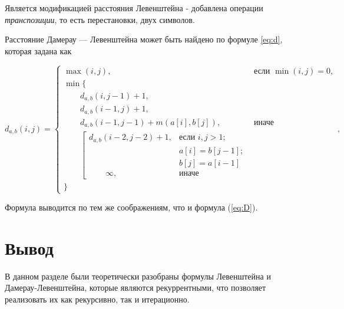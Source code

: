Является модификацией расстояния Левенштейна - добавлена операции \textit{транспозиции}, то есть перестановки, двух символов.

Расстояние Дамерау — Левенштейна может быть найдено по формуле \ref{eq:d}, которая задана как


\begin{equation}
	\label{eq:d}
	d_{a,b}(i, j) = \begin{cases}
		\max(i, j), &\text{если }\min(i, j) = 0,\\
		\min \lbrace \\
			\qquad d_{a,b}(i, j-1) + 1,\\
			\qquad d_{a,b}(i-1, j) + 1,\\
			\qquad d_{a,b}(i-1, j-1) + m(a[i], b[j]), &\text{иначе}\\
			\qquad \left[ \begin{array}{cc}d_{a,b}(i-2, j-2) + 1, &\text{если }i,j > 1;\\
			\qquad &\text{}a[i] = b[j-1]; \\
			\qquad &\text{}b[j] = a[i-1]\\
			\qquad \infty, & \text{иначе}\end{array}\right.\\
		\rbrace
		\end{cases},
\end{equation}

Формула выводится по тем же соображениям, что и формула (\ref{eq:D}).


\section*{Вывод}
В данном разделе были теоретически разобраны формулы Левенштейна и Дамерау-Левенштейна, которые являются рекуррентными, что позволяет реализовать их как рекурсивно, так и итерационно.